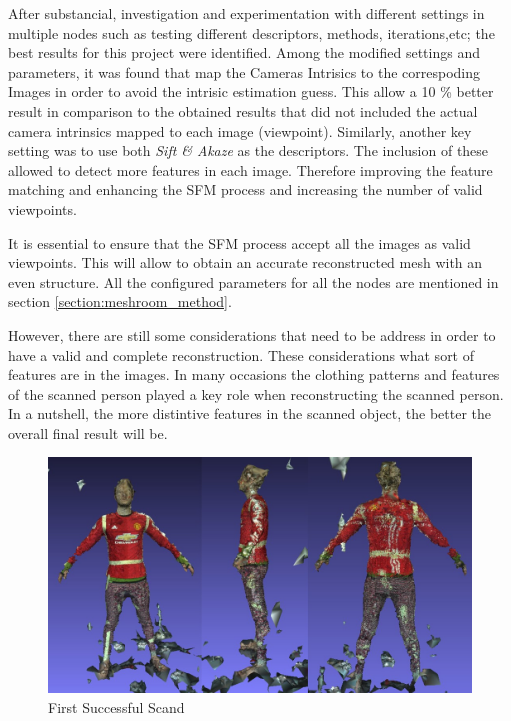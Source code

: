 \documentclass[12pt]{report}
\begin{document}
After substancial, investigation and experimentation with different settings in multiple nodes such as testing different descriptors, methods, iterations,etc; the best results for this project were identified.
Among the modified settings and parameters, it was found that map the Cameras Intrisics to the correspoding Images  in order to avoid the intrisic estimation guess. 
This allow a 10 \% better result in comparison to the obtained results that did not included the actual camera intrinsics mapped to each image (viewpoint).
Similarly, another key setting was to use both \textit{Sift \& Akaze} as the descriptors. The inclusion of these allowed to detect more features in each image. 
Therefore improving the feature matching and enhancing the SFM process and increasing the number of valid viewpoints.

It is essential to ensure that the SFM process accept all the images as valid viewpoints. This will allow to obtain an accurate reconstructed mesh with an even structure.
All the configured parameters for all the nodes are mentioned in section \ref{section:meshroom_method}.

However, there are still some considerations that need to be address in order to have a valid and complete reconstruction. 
These considerations what sort of features  are in the images. In many occasions the clothing patterns and features of the scanned person played a key role when reconstructing the scanned person. 
In a nutshell, the more distintive features in the scanned object, the better the overall final result will be. 


\begin{figure}[H]%
  \centering
 \includegraphics[width=1\textwidth]{scan1.png}
\caption{First Successful Scand}
\label{fig:scan1} 
\end{figure}
\end{document}
